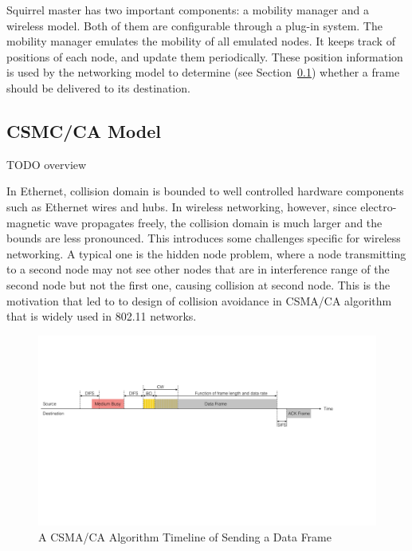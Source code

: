 \documentclass[12pt]{report}
\begin{document}
Squirrel master has two important components: a mobility manager and a wireless model. Both of them are configurable through a plug-in system. The mobility manager emulates the mobility of all emulated nodes. It keeps track of positions of each node, and update them periodically. These position information is used by the networking model to determine (see Section~\ref{sec:squirrel_model}) whether a frame should be delivered to its destination.

\subsection{CSMC/CA Model}
\label{sec:squirrel_model}

TODO overview

In Ethernet, collision domain is bounded to well controlled hardware components such as Ethernet wires and hubs. In wireless networking, however, since electro-magnetic wave propagates freely, the collision domain is much larger and the bounds are less pronounced. This introduces some challenges specific for wireless networking. A typical one is the hidden node problem, where a node transmitting to a second node may not see other nodes that are in interference range of the second node but not the first one, causing collision at second node. This is the motivation that led to to design of collision avoidance in CSMA/CA algorithm that is widely used in 802.11 networks.

\begin{figure}[h]
  \begin{center}
    \includegraphics[width=\textwidth]{figures/csmaca.pdf}
    \caption{\label{fig:csmaca}A CSMA/CA Algorithm Timeline of Sending a Data Frame}
  \end{center}
\end{figure}
\end{document}
